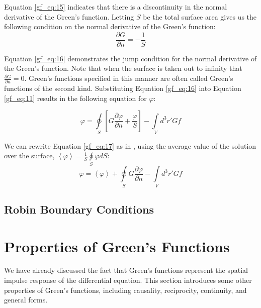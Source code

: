 Equation \ref{gf_eq:15} indicates that there is a discontinuity in the normal derivative of the Green's function. Letting $S$ be the total surface area gives us the following condition on the normal derivative of the Green's function:
\begin{equation}
\frac{\partial G}{\partial n} = -\frac{1}{S}
\label{gf_eq:16}
\end{equation}
\renewcommand{\baselinestretch}{2} \small\normalsize

Equation \ref{gf_eq:16} demonstrates the jump condition for the normal derivative of the Green's function. Note that when the surface is taken out to infinity that $\frac{\partial G}{\partial n} = 0$. Green's functions specified in this manner are often called Green's functions of the second kind. Substituting Equation \ref{gf_eq:16} into Equation \ref{gf_eq:11} results in the following equation for $\varphi$:

\begin{equation}
\boxed{\varphi = \oint\limits_{S}\left[G\frac{\partial \varphi}{\partial n} + \frac{\varphi}{S} \right] -\int\limits_{V}d^3r' Gf}
\label{gf_eq:17}
\end{equation}
\renewcommand{\baselinestretch}{2} \small\normalsize

We can rewrite Equation \ref{gf_eq:17} as in \cite{jackson_classical_em}, using the average value of the solution over the surface, $\left< \varphi\right> = \frac{1}{S}\oint\limits_{S}\varphi dS$:
\begin{equation}
\boxed{\varphi = \left<\varphi \right> + \oint\limits_{S}G\frac{\partial \varphi}{\partial n}  -\int\limits_{V}d^3r' Gf}
\label{gf_eq:18}
\end{equation}
\renewcommand{\baselinestretch}{2} \small\normalsize

\subsection{Robin Boundary Conditions}

\section{Properties of Green's Functions} \label{gf_sec:properties}
We have already discussed the fact that Green's functions represent the spatial impulse response of the differential equation. This section introduces some other properties of Green's functions, including causality, reciprocity, continuity, and general forms.

